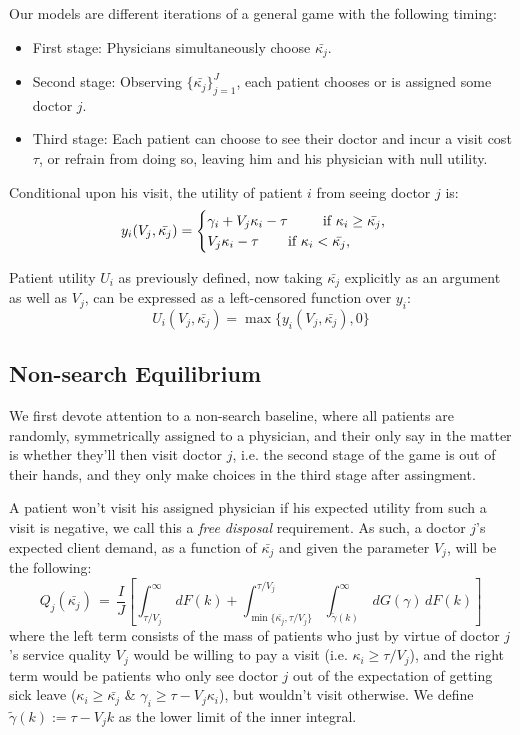 \documentclass{article}
\begin{document}
Our models are different iterations of a general game with the following timing:
\begin{itemize}
    \item First stage: Physicians simultaneously choose $\bar{\kappa_j}$.
    \item Second stage: Observing $\{\bar{\kappa_j}\}_{j =1}^{J}$, each patient chooses or is assigned some doctor $j$.
    \item Third stage: Each patient can choose to see their doctor and incur a visit cost $\tau$, or refrain from doing so, leaving him and his physician with null utility.
\end{itemize}

Conditional upon his visit, the utility of patient $i$ from seeing doctor $j$ is:
\[
    y_i(V_j,\bar{\kappa_j}) =\begin{cases}
    \gamma_i + V_j \kappa_i - \tau \text{  \hspace{0.65cm} if $\kappa_i \geq \bar{\kappa_j}$,} \\
    V_j \kappa_i - \tau \text{  \hspace{0.5cm} if $\kappa_i < \bar{\kappa_j}$,}
    \end{cases}
\]

Patient utility $U_i$ as previously defined, now taking $\bar{\kappa_j}$ explicitly as an argument as well as $V_j$, can be expressed as a left-censored function over $y_i$:
\[
U_i(V_j,\bar{\kappa_j}) =  \operatorname{max} \{y_i(V_j,\bar{\kappa_j}),0\}
\]

\subsection{Non-search Equilibrium}

We first devote attention to a non-search baseline, where all patients are randomly, symmetrically assigned to a physician, and their only say in the matter is whether they’ll then visit doctor $j$, i.e. the second stage of the game is out of their hands, and they only make choices in the third stage after assingment.

A patient won’t visit his assigned physician if his expected utility from such a visit is negative, we call this a \textit{free disposal} requirement. As such, a doctor $j$’s expected client demand, as a function of $\bar{\kappa_j}$ and given the parameter $V_j$, will be the following:
\begin{equation}
    Q_j(\bar{\kappa_j}) \,=\, \frac{I}{J}\left[ \int_{\tau/V_j}^{\infty}\,dF(k) +  \int_{\min\{\bar{\kappa_j},\tau/V_j\}}^{\tau/V_j} \int_{\tilde{\gamma}(k)}^{\infty} \,dG(\gamma) \,dF(k) \right] \tag{N.1}\label{eq:ns_Q}
\end{equation}
where the left term consists of the mass of patients who just by virtue of doctor $j$’s service quality $V_j$ would be willing to pay a visit (i.e. $\kappa_i \geq \tau/V_j$), and the right term would be patients who only see doctor $j$ out of the expectation of getting sick leave ($\kappa_i \geq \bar{\kappa_j}$ \& $\gamma_i \geq \tau - V_j \kappa_i$), but wouldn’t visit otherwise. We define $\tilde{\gamma}(k) := \tau - V_j k$ as the lower limit of the inner integral.
\end{document}
